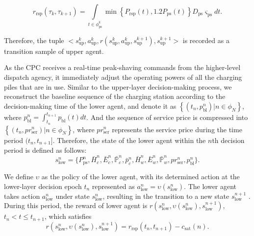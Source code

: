 \documentclass[preprint,12pt]{elsarticle}
\begin{document}
\begin{equation}
r_{\textrm{rsp}}(\tau_{k},\tau_{k+1})=\underset{t\in\phi_{\textrm{ps}}^{k}}{\int}\min\left\{ P_{\textrm{rsp}}(t),1.2P_{\textrm{ps}}(t)\right\} D_{\textrm{ps}}\varsigma_{\textrm{ps}}dt.
\end{equation}

Therefore, the tuple $<s_{\textrm{up}}^{k},a_{\textrm{up}}^{k},r(s_{\textrm{up}}^{k},a_{\textrm{up}}^{k},s_{\textrm{up}}^{k+1}),s_{\textrm{up}}^{k+1}>$ is recorded as a transition sample of upper agent.

As the CPC receives a real-time peak-shaving commands from the higher-level dispatch agency, it immediately adjust the operating powers of all the charging piles that are in use. Similar to the upper-layer decision-making process, we reconstruct the baseline sequence of the charging station according to the decision-making time of the lower agent, and denote it as $\left\{ \left(t_{n},p_{\textrm{bl}}^{n}\right)|n\in\phi_{N}\right\} $, where $p_{\textrm{bl}}^{n}=\int_{t_{n}}^{t_{n+1}}p_{\textrm{bl}}(t)dt$. And the sequence of service price is compressed into $\left\{ \left(t_{n},pr_{\textrm{ser}}^{n}\right)|n\in\phi_{N}\right\} $, where $pr_{\textrm{ser}}^{n}$ represents the service price during the time period $(t_{n},t_{n+1}]$. Therefore, the state of the lower agent within the $n$th decision period is defined as follows:
\begin{equation}
s_{\textrm{low}}^{n}=\{P_{\textrm{ps}}^{n},\bar{H}_{c}^{n},\bar{E}_{c}^{n},\bar{\mathbb{P}}_{c}^{n},\bar{p}_{c}^{n},\bar{H}_{w}^{n},\bar{E}_{w}^{n},\bar{\mathbb{P}}_{w}^{n},pr_{\textrm{ser}}^{n},p_{\textrm{bl}}^{n}\}.
\end{equation}

We define $\upsilon$ as the policy of the lower agent, with its determined action at the lower-layer decision epoch $t_{n}$ represented as $a_{\textrm{low}}^{n}=\upsilon(s_{\textrm{low}}^{n})$. The lower agent takes action $a_{\textrm{low}}^{n}$ under state $s_{\textrm{low}}^{n}$, resulting in the transition to a new state $s_{\textrm{low}}^{n+1}$ . During this period, the reward of lower agent is $r(s_{\textrm{low}}^{n},\upsilon(s_{\textrm{low}}^{n}),s_{\textrm{low}}^{n+1})$, $t_{n}<t\leq t_{n+1}$, which satisfies
\begin{equation}
r(s_{\textrm{low}}^{n},\upsilon(s_{\textrm{low}}^{n}),s_{\textrm{low}}^{n+1})=r_{\textrm{rsp}}(t_{n},t_{n+1})-c_{\textrm{sat}}\left(n\right).\label{eq:transit_reward_low}
\end{equation}
\end{document}
